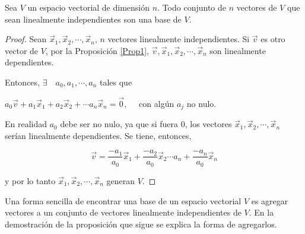\begin{theorem}
\label{2123}


Sea $V$ un espacio vectorial de dimensión $n$. Todo conjunto de $n$ vectores de $V$ que sean linealmente independientes son una base de $V$.

\begin{proof}


Sean $\vec{x}_1,\vec{x}_2,\cdots, \vec{x}_n $,   $n$ vectores linealmente independientes. Si $\vec{v}$  es otro vector de $V$, por la Proposición  \ref{Prop1},   $ \vec{v}, \vec{x}_1,\vec{x}_2,\cdots, \vec{x}_n $  son linealmente dependientes.  
    
\bigskip

 Entonces, $\exists   \quad      a_0, a_1,  \cdots,  a_n$ tales que 

\bigskip

$ a_0 \vec{v} + a_1 \vec{x}_1+ a_2\vec{x}_2+ \cdots a_n \vec{x}_n = \vec{0}, \quad$   con algún $a_j$ no nulo.

\bigskip

En realidad $a_0$ debe ser no nulo, ya que si fuera $0$, los vectores $\vec{x}_1,\vec{x}_2,\cdots, \vec{x}_n $ serían linealmente dependientes. Se tiene, entonces, 
 
 
 



\[\vec{v} = \frac{-a_1}{a_0}  \vec{x}_1+\frac{-a_2}{a_0}  \vec{x}_2 \cdots a_n +\frac{-a_n}{a_0} \vec{x}_n \] 




\bigskip
\noindent
y por lo tanto $\vec{x}_1,\vec{x}_2,\cdots, \vec{x}_n $ generan $V$.

\end{proof}
\end{theorem}


\begin{remark}
Una forma sencilla de encontrar una base de un espacio vectorial $V$ es agregar vectores a un conjunto de vectores linealmente independientes de $V$. En la demostración de la proposición que sigue se explica la forma de agregarlos.
\end{remark}

\bigskip

